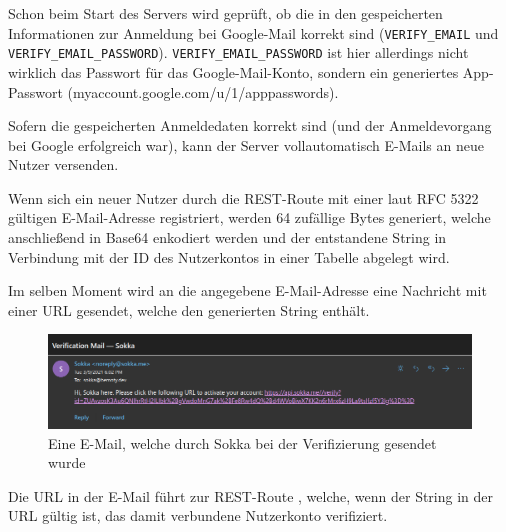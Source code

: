 Schon beim Start des Servers wird geprüft, ob die in den \textit{} gespeicherten Informationen zur Anmeldung bei Google-Mail korrekt sind (\lstinline{VERIFY_EMAIL} und \lstinline{VERIFY_EMAIL_PASSWORD}). \lstinline{VERIFY_EMAIL_PASSWORD} ist hier allerdings nicht wirklich das Passwort für das Google-Mail-Konto, sondern ein generiertes App-Passwort (myaccount.google.com/u/1/apppasswords).

Sofern die gespeicherten Anmeldedaten korrekt sind (und der Anmeldevorgang bei Google erfolgreich war), kann der Server vollautomatisch E-Mails an neue Nutzer versenden.

Wenn sich ein neuer Nutzer durch die REST-Route \textit{} mit einer laut RFC 5322 gültigen E-Mail-Adresse registriert, werden 64 zufällige Bytes generiert, welche anschließend in Base64 enkodiert werden und der entstandene String in Verbindung mit der ID des Nutzerkontos in einer Tabelle abgelegt wird.

Im selben Moment wird an die angegebene E-Mail-Adresse eine Nachricht mit einer URL gesendet, welche den generierten String enthält.

\begin{figure}[htp]
    \begin{center}
        \includegraphics[width=1\textwidth]{images/Backend/mail.png}
        \caption{Eine E-Mail, welche durch Sokka bei der Verifizierung gesendet wurde}
    \end{center}
\end{figure}

Die URL in der E-Mail führt zur REST-Route \textit{}, welche, wenn der String in der URL gültig ist, das damit verbundene Nutzerkonto verifiziert.

